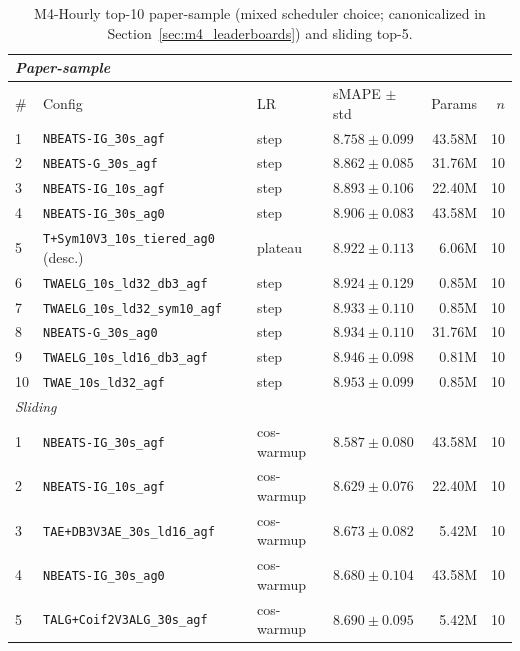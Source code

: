 \documentclass[11pt,a4paper]{article}
\begin{document}
\begin{table}[h]
\centering
\scriptsize
\setlength{\tabcolsep}{2.5pt}
\caption{M4-Hourly top-10 paper-sample (mixed scheduler choice; canonicalized in Section~\ref{sec:m4_leaderboards}) and sliding top-5.}
\label{tab:m4_hourly_full}
\begin{tabular}{@{}llllrr@{}}
\toprule
\multicolumn{6}{l}{\textit{Paper-sample}} \\
\midrule
\# & Config & LR & sMAPE $\pm$ std & Params & $n$ \\
\midrule
1  & \texttt{NBEATS-IG\_30s\_agf}                  & step    & $\mathbf{8.758 \pm 0.099}$ & 43.58M & 10 \\
2  & \texttt{NBEATS-G\_30s\_agf}                   & step    & $8.862 \pm 0.085$          & 31.76M & 10 \\
3  & \texttt{NBEATS-IG\_10s\_agf}                  & step    & $8.893 \pm 0.106$          & 22.40M & 10 \\
4  & \texttt{NBEATS-IG\_30s\_ag0}                  & step    & $8.906 \pm 0.083$          & 43.58M & 10 \\
5  & \texttt{T+Sym10V3\_10s\_tiered\_ag0} (desc.)  & plateau & $8.922 \pm 0.113$          & 6.06M  & 10 \\
6  & \texttt{TWAELG\_10s\_ld32\_db3\_agf}          & step    & $8.924 \pm 0.129$          & 0.85M  & 10 \\
7  & \texttt{TWAELG\_10s\_ld32\_sym10\_agf}        & step    & $8.933 \pm 0.110$          & 0.85M  & 10 \\
8  & \texttt{NBEATS-G\_30s\_ag0}                   & step    & $8.934 \pm 0.110$          & 31.76M & 10 \\
9  & \texttt{TWAELG\_10s\_ld16\_db3\_agf}          & step    & $8.946 \pm 0.098$          & 0.81M  & 10 \\
10 & \texttt{TWAE\_10s\_ld32\_agf}                 & step    & $8.953 \pm 0.099$          & 0.85M  & 10 \\
\midrule
\multicolumn{6}{l}{\textit{Sliding}} \\
\midrule
1  & \texttt{NBEATS-IG\_30s\_agf}                  & cos-warmup & $\mathbf{8.587 \pm 0.080}$ & 43.58M & 10 \\
2  & \texttt{NBEATS-IG\_10s\_agf}                  & cos-warmup & $8.629 \pm 0.076$          & 22.40M & 10 \\
3  & \texttt{TAE+DB3V3AE\_30s\_ld16\_agf}          & cos-warmup & $8.673 \pm 0.082$          & 5.42M  & 10 \\
4  & \texttt{NBEATS-IG\_30s\_ag0}                  & cos-warmup & $8.680 \pm 0.104$          & 43.58M & 10 \\
5  & \texttt{TALG+Coif2V3ALG\_30s\_agf}            & cos-warmup & $8.690 \pm 0.095$          & 5.42M  & 10 \\
\bottomrule
\end{tabular}
\end{table}
\end{document}
